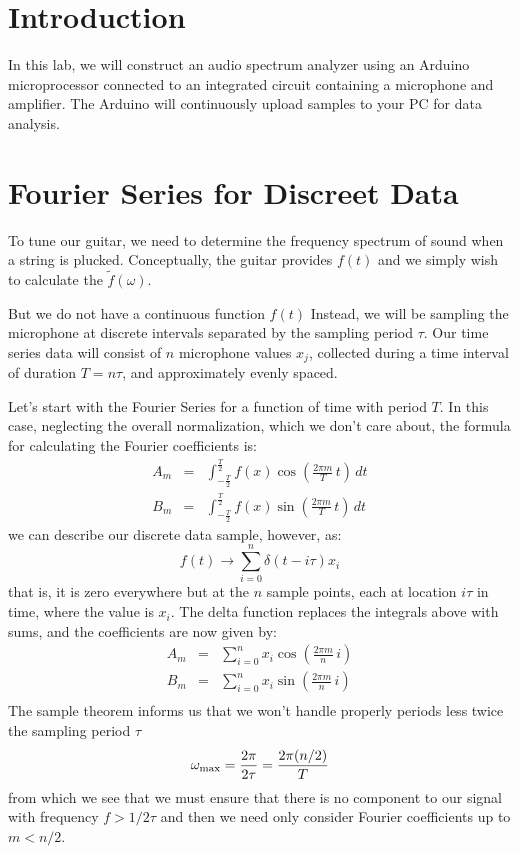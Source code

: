 \documentclass[12pt]{article}
\begin{document}
\section{Introduction}

In this lab, we will construct an audio spectrum analyzer using an Arduino
microprocessor connected to an integrated circuit containing a microphone and
amplifier.  The Arduino will continuously upload samples to your PC for data analysis.

\section{Fourier Series for Discreet Data}

To tune our guitar, we need to determine the frequency spectrum of sound when a string is plucked.   Conceptually, the guitar provides $f(t)$ and we simply wish to calculate the $\widetilde{f}(\omega)$.

But we do not have a continuous function $f(t)$   Instead, we will be sampling the microphone at discrete intervals separated by the sampling period $\tau$.  Our time series data will consist of $n$ microphone values $x_j$, collected during a time interval of duration $T = n\tau$, and approximately evenly spaced.  

Let's start with the Fourier Series for a function of time with period $T$.  In this case, neglecting the overall normalization, which we don't care about, the formula for calculating the Fourier coefficients is:
\begin{eqnarray*}
A_m &=&  \int_{-\frac{T}{2}}^{\frac{T}{2}} 
f(x) \cos\left(\frac{2\pi m}{T} \, t \right) \, dt \\
B_m &=& \int_{-\frac{T}{2}}^{\frac{T}{2}} 
f(x) \sin\left(\frac{2\pi m}{T} \, t \right) \, dt
\end{eqnarray*}
we can describe our discrete data sample, however, as:
\begin{equation*}
f(t) \to \sum_{i=0}^n \delta(t-i\tau) x_i
\end{equation*}
that is, it is zero everywhere but at the $n$ sample points, each at location $i\tau$ in time, where the value is $x_i$.
The delta function replaces the integrals above with sums, and the coefficients are now given by:
\begin{eqnarray*}
A_m &=&  \sum_{i=0}^n x_i  \cos\left(\frac{2\pi m}{n} \, i \right) \\
B_m &=&  \sum_{i=0}^n x_i  \sin\left(\frac{2\pi m}{n} \, i \right) \\
\end{eqnarray*}
The sample theorem informs us that we won't handle properly periods less twice the sampling period $\tau$
\begin{displaymath}
\omega_{\rm max} = \frac{2 \pi}{ 2 \tau} = \frac{2 \pi (n/2)}{T}
\end{displaymath}
from which we see that we must ensure that there is no component to our signal with frequency $f > 1/2\tau$ and then we need only consider Fourier coefficients up to $m < n/2$.
\end{document}

